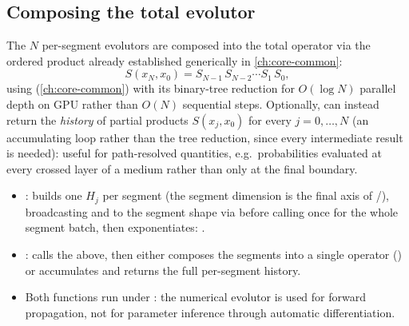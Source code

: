 \begin{theorybox}
\subsection*{Composing the total evolutor}
The $N$ per-segment evolutors are composed into the total operator via the
ordered product already established generically in
\cref{ch:core-common}:
\begin{equation}
  S(x_N,x_0) = S_{N-1}\,S_{N-2}\cdots S_1\,S_0,
\end{equation}
using  (\cref{ch:core-common}) with its
binary-tree reduction for $O(\log N)$ parallel depth on GPU rather than
$O(N)$ sequential steps. Optionally,  can
instead return the \emph{history} of partial products
$S(x_j,x_0)$ for every $j=0,\dots,N$ (an accumulating loop rather than the
tree reduction, since every intermediate result is needed): useful for
path-resolved quantities, e.g.\ probabilities evaluated at every crossed
layer of a medium rather than only at the final boundary.
\end{theorybox}

\begin{implbox}
\begin{itemize}
  \item {}: builds one $H_j$ per segment
    (the segment dimension is the final axis of
    /), broadcasting
     and  to the segment shape
    via  before calling 
    once for the whole segment batch, then exponentiates:
    .
  \item {}: calls
    the above, then either composes the segments into a single operator
    () or accumulates and returns the
    full per-segment history.
  \item Both functions run under : the numerical
    evolutor is used for forward propagation, not for parameter inference
    through automatic differentiation.
\end{itemize}
\end{implbox}

